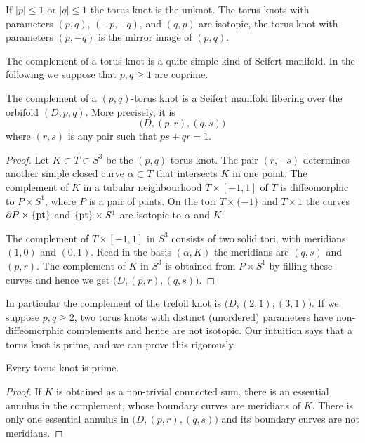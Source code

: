 \begin{ex} \label{trivial:torus:knot:ex}
If $|p|\leqslant 1$ or $|q|\leqslant 1$ the torus knot is the unknot. The torus knots with parameters $(p,q)$, $(-p,-q)$, and $(q,p)$ are isotopic, the torus knot with parameters $(p,-q)$ is the mirror image of $(p,q)$.
\end{ex}

The complement of a torus knot is a quite simple kind of Seifert manifold. In the following we suppose that $p,q \geqslant 1$ are coprime. 

\begin{prop} \label{torus:knot:complement:prop}
The complement of a $(p,q)$-torus knot is a Seifert manifold fibering over the orbifold $(D,p,q)$. More precisely, it is
$$\big(D, (p,r), (q,s)\big)$$
where $(r,s)$ is any pair such that $ps+qr = 1$.
\end{prop}
\begin{proof}
Let $K \subset T \subset S^3$ be the $(p,q)$-torus knot. The pair $(r,-s)$ determines another simple closed curve $\alpha \subset T$ that intersects $K$ in one point. The complement of $K$ in a tubular neighbourhood $T\times [-1,1]$ of $T$ is diffeomorphic to $P\times S^1$, where $P$ is a pair of pants. On the tori $T\times \{-1\}$ and $T \times 1$ the curves $\partial P \times \{{\rm pt}\}$ and $\{{\rm pt}\} \times S^1$ are isotopic to $\alpha$ and $K$.

The complement of $T\times [-1,1]$ in $S^3$ consists of two solid tori, with meridians $(1,0)$ and $(0,1)$. Read in the basis $(\alpha, K)$ the meridians are $(q,s)$ and $(p,r)$. The complement of $K$ in $S^3$ is obtained from $P\times S^1$ by filling these curves and hence we get $\big(D, (p,r), (q,s)\big)$.
\end{proof}

In particular the complement of the trefoil knot is $\big(D,(2,1), (3,1)\big)$. If we suppose $p,q\geqslant 2$, two torus knots with distinct (unordered) parameters have non-diffeomorphic complements and hence are not isotopic.
Our intuition says that a torus knot is prime, and we can prove this rigorously.

\begin{prop}
Every torus knot is prime. 
\end{prop}
\begin{proof}
If $K$ is obtained as a non-trivial connected sum, there is an essential annulus in the complement, whose boundary curves are meridians of $K$. There is only one essential annulus in $\big(D, (p,r), (q,s)\big)$ and its boundary curves are not meridians.
\end{proof}

